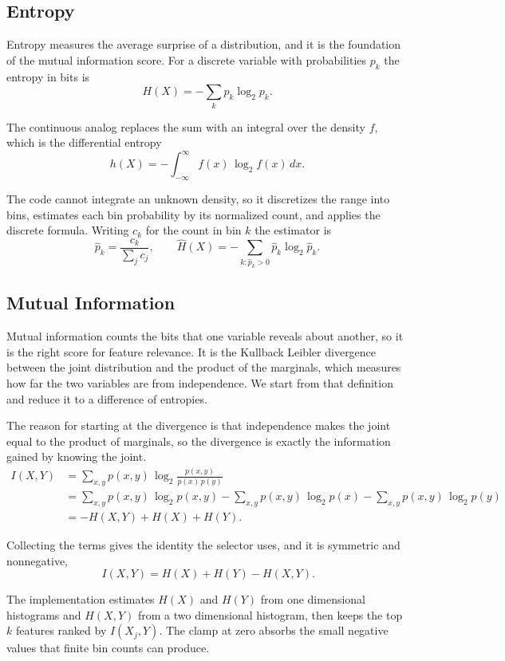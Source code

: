 \documentclass[12pt,letterpaper]{article}
\begin{document}
\subsection{Entropy}

Entropy measures the average surprise of a distribution, and it is the
foundation of the mutual information score. For a discrete variable with
probabilities $p_k$ the entropy in bits is
\[
H(X) = -\sum_{k} p_k \log_2 p_k .
\]

The continuous analog replaces the sum with an integral over the density $f$,
which is the differential entropy
\[
h(X) = -\int_{-\infty}^{\infty} f(x)\,\log_2 f(x)\,dx .
\]

The code cannot integrate an unknown density, so it discretizes the range into
bins, estimates each bin probability by its normalized count, and applies the
discrete formula. Writing $c_k$ for the count in bin $k$ the estimator is
\[
\hat p_k = \frac{c_k}{\sum_j c_j},
\qquad
\hat H(X) = -\sum_{k : \hat p_k > 0} \hat p_k \log_2 \hat p_k .
\]

\subsection{Mutual Information}

Mutual information counts the bits that one variable reveals about another, so
it is the right score for feature relevance. It is the Kullback Leibler
divergence between the joint distribution and the product of the marginals,
which measures how far the two variables are from independence. We start from
that definition and reduce it to a difference of entropies.

The reason for starting at the divergence is that independence makes the joint
equal to the product of marginals, so the divergence is exactly the information
gained by knowing the joint.
\begin{align*}
I(X,Y)
  &= \sum_{x,y} p(x,y)\,\log_2\!\frac{p(x,y)}{p(x)\,p(y)} \\
  &= \sum_{x,y} p(x,y)\,\log_2 p(x,y)
     - \sum_{x,y} p(x,y)\,\log_2 p(x)
     - \sum_{x,y} p(x,y)\,\log_2 p(y) \\
  &= -H(X,Y) + H(X) + H(Y).
\end{align*}

Collecting the terms gives the identity the selector uses, and it is symmetric
and nonnegative,
\[
\boxed{\,I(X,Y) = H(X) + H(Y) - H(X,Y).}
\]

The implementation estimates $H(X)$ and $H(Y)$ from one dimensional histograms
and $H(X,Y)$ from a two dimensional histogram, then keeps the top $k$ features
ranked by $I(X_j, Y)$. The clamp at zero absorbs the small negative values that
finite bin counts can produce.
\end{document}
